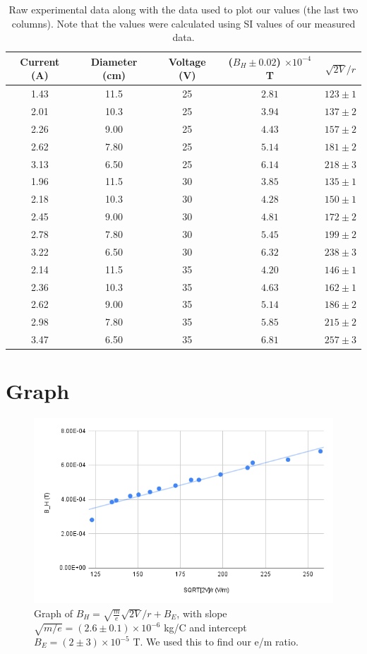 \documentclass[12pt]{article}
\begin{document}
\begin{table}[h]\centering
    \caption{Raw experimental data along with the data used to plot our values (the last two columns). Note that the values were calculated using SI values of our measured data.}
    \begin{tabular}{c c c c c} \toprule
        Current (A) & Diameter (cm) & Voltage (V) & ($B_H \pm 0.02$) $\times 10^{-4}$ T & $\sqrt{2V}/r$ \\ \midrule
        1.43 & 11.5 & 25 & $2.81$ & $123 \pm 1$ \\
        2.01 & 10.3 & 25 & $3.94$ & $137 \pm 2$ \\
        2.26 & 9.00 & 25 & $4.43$ & $157 \pm 2$ \\
        2.62 & 7.80 & 25 & $5.14$ & $181 \pm 2$ \\
        3.13 & 6.50 & 25 & $6.14$ & $218 \pm 3$ \\
        1.96 & 11.5 & 30 & $3.85$ & $135 \pm 1$ \\
        2.18 & 10.3 & 30 & $4.28$ & $150 \pm 1$ \\
        2.45 & 9.00 & 30 & $4.81$ & $172 \pm 2$ \\
        2.78 & 7.80 & 30 & $5.45$ & $199 \pm 2$ \\
        3.22 & 6.50 & 30 & $6.32$ & $238 \pm 3$ \\
        2.14 & 11.5 & 35 & $4.20$ & $146 \pm 1$ \\
        2.36 & 10.3 & 35 & $4.63$ & $162 \pm 1$ \\
        2.62 & 9.00 & 35 & $5.14$ & $186 \pm 2$ \\
        2.98 & 7.80 & 35 & $5.85$ & $215 \pm 2$ \\
        3.47 & 6.50 & 35 & $6.81$ & $257 \pm 3$ \\ \bottomrule
    \end{tabular}
\end{table}

\section{Graph}
\begin{figure}[H]
    \centering
    \includegraphics[width=\textwidth]{chart.png}
    \caption{Graph of $B_H = \sqrt{\frac{m}{e}}\sqrt{2V}/r + B_E$, with slope $\sqrt{m/e} = (2.6 \pm 0.1) \times 10^{-6}$ kg/C and intercept $B_E = (2 \pm 3) \times 10^{-5}$ T.
        We used this to find our e/m ratio.}
    \label{fig:bh_vs_sqrt2v_r}
\end{figure}
\end{document}
